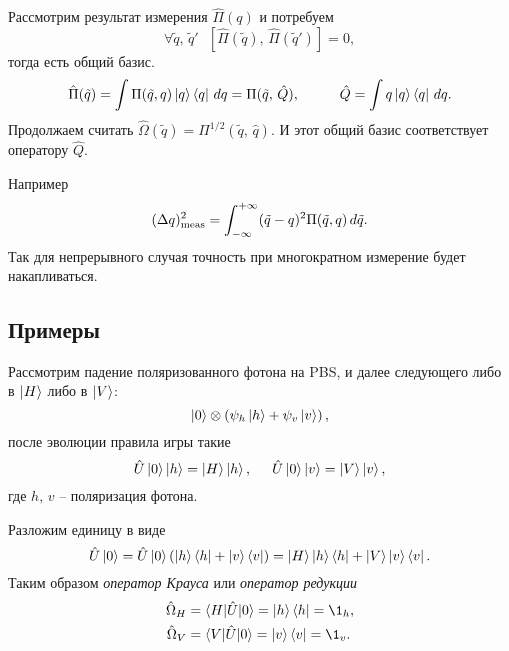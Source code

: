 Рассмотрим результат измерения $\hat{\Pi}(q)$ и потребуем
\begin{equation*}
	\forall \tilde{q},\, \tilde{q}' \ \ \ \left[
		\hat{\Pi}(\tilde{q}),\, \hat{\Pi}(\tilde{q}')
	\right] = 0,
\end{equation*}
тогда есть общий базис. 
\begin{equation*}
	\hat{\Pi}(\tilde{q}) = \int \Pi(\tilde{q},q) \kb{q}{q} \d q = \Pi(\tilde{q},\, \hat{Q}),
	\hspace{10 mm} 
	\hat{Q} = \int q \kb{q}{q} \d q.
\end{equation*}
Продолжаем считать $\hat{\Omega} (\tilde{q}) = \Pi^{1/2} (\tilde{q},\, \hat{q})$. 
И этот общий базис соответствует оператору $\hat{Q}$. 

Например
\begin{equation*}
	(\Delta q)^2_{\textnormal{meas}} = \int_{-\infty}^{+\infty} (\tilde{q}-q)^2 \Pi(\tilde{q},q) \, d \tilde{q}.
\end{equation*}
Так для непрерывного случая точность при многократном измерение будет накапливаться.


\subsection*{Примеры}

Рассмотрим падение поляризованного фотона на PBS, и далее следующего либо в $\left| H \right\rangle$ либо в $\left| V \right\rangle$:
\begin{equation*}
	\left| 0 \right\rangle \otimes \left(
		\psi_h \left| h \right\rangle + \psi_v \left| v \right\rangle
	\right),
\end{equation*}	
после эволюции правила игры такие
\begin{equation*}
	\hat{U} \left| 0 \right\rangle \left| h \right\rangle = \left| H \right\rangle \left| h \right\rangle,
	\hspace{5 mm} 
	\hat{U} \left| 0 \right\rangle \left| v \right\rangle = \left| V \right\rangle \left| v \right\rangle,
\end{equation*}
где $h,\, v$ -- поляризация фотона. 

Разложим единицу в виде
\begin{equation*}
	\hat{U} \left| 0 \right\rangle = \hat{U} \left| 0 \right\rangle \left(
		\left| h \right\rangle \left\langle h \right| + \left| v \right\rangle \left\langle v \right|
	\right) = \left| H \right\rangle \left| h \right\rangle \left\langle h \right| + \left| V \right\rangle \left| v \right\rangle \left\langle v \right|.
\end{equation*}
Таким образом \textit{оператор Крауса} или \textit{оператор редукции}
\begin{align*}
	\hat{\Omega}_H &= \bk{H}[\hat{U}]{0} = \kb{h}{h} = \1_h, \\
	\hat{\Omega}_V &= \bk{V}[\hat{U}]{0} = \kb{v}{v} = \1_v.
\end{align*}










